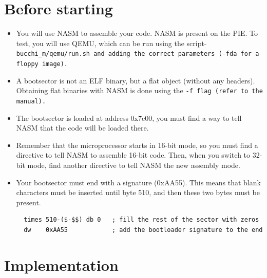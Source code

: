 \section*{Before starting}

\begin{itemize}
\item
  You will use NASM to assemble your code. NASM is present on the
  PIE. To test, you will use QEMU, which can be run using the script
  \tt $\tilde{}$bucchi\_m/qemu/run.sh \rm and adding the correct parameters
  (\tt -fda \rm for a floppy image).
\item
  A bootsector is not an ELF binary, but a flat object (without any
  headers). Obtaining flat binaries with NASM is done using the \tt -f \rm
  flag (refer to the manual).
\item
  The bootsector is loaded at address 0x7c00, you must find a way to
  tell NASM that the code will be loaded there.
\item
  Remember that the microprocessor starts in 16-bit mode, so you must
  find a directive to tell NASM to assemble 16-bit code. Then, when
  you switch to 32-bit mode, find another directive to tell NASM the
  new assembly mode.
\item
  Your bootsector must end with a signature (0xAA55). This means that
  blank characters must be inserted until byte 510, and then these two
  bytes must be present.
  \begin{verbatim}
  times 510-($-$$) db 0	  ; fill the rest of the sector with zeros
  dw    0xAA55            ; add the bootloader signature to the end
  \end{verbatim}
\end{itemize}

\newpage

\section*{Implementation}

